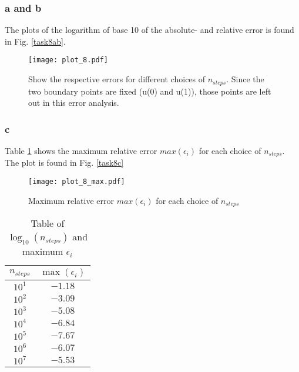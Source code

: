 \subsubsection{a and b}

The plots of the logarithm of base 10 of the absolute- and relative error is found in Fig. \ref{task8ab}. 

\begin{figure}
    \centering
    \texttt{[image: plot\_8.pdf]}
    \caption{Show the respective errors for different choices of $n_{steps}$. Since the two boundary points are fixed (u(0) and u(1)), those points are left out in this error analysis.}
    \label{fig:task8ab}
\end{figure}


\subsubsection{c}
Table \ref{tab:table8c} shows the maximum relative error $max(\epsilon_i)$ for each choice of $n_{steps}$. The plot is found in Fig. \ref{task8c} 

\begin{figure}
    \centering
    \texttt{[image: plot\_8\_max.pdf]}
    \caption{Maximum relative error $max(\epsilon_i)$ for each choice of $n_{steps}$}
    \label{fig:task8c}
\end{figure}

\begin{table}[]
    \centering
    \begin{tabular}{|c|c|}
        \hline
        $n_{steps}$ & $\max(\epsilon_i)$ \\ \hline
        $10^{1}$ & $-1.18$ \\ \hline
        $10^{2}$ & $-3.09$ \\ \hline
        $10^{3}$ & $-5.08$ \\ \hline
        $10^{4}$ & $-6.84$ \\ \hline
        $10^{5}$ & $-7.67$ \\ \hline
        $10^{6}$ & $-6.07$ \\ \hline
        $10^{7}$ & $-5.53$ \\ \hline
        
    \end{tabular}
    \caption{Table of $\log_{10}(n_{steps})$ and maximum $\epsilon_i$}
    \label{tab:table8c}
\end{table}


